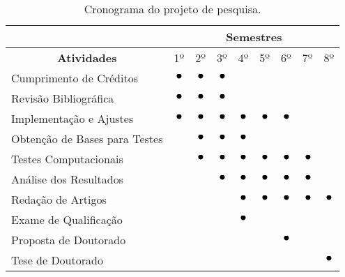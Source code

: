 \documentclass[brazil]{article}
\newcommand{\bigbullet}{\,\begin{picture}(-1,1)(-1,-2)\circle*{5}\end{picture}\ }
\begin{document}
\begin{table}[!h]
\begin{tabular}{l|c|c|c|c|c|c|c|c|}
  \cline{2-9}
  & \multicolumn{8}{|c|}{\textbf{Semestres}} \\
  \hline
  \multicolumn{1}{|c|}{\textbf{Atividades}}
    & 1º & 2º & 3º & 4º & 5º & 6º & 7º & 8º \\ \hline
  \multicolumn{1}{|l|}{Cumprimento de Créditos}
    & $\bigbullet$ & $\bigbullet$ & $\bigbullet$ & & & & & \\ \hline
  \multicolumn{1}{|l|}{Revisão Bibliográfica}
    & $\bigbullet$ & $\bigbullet$ & $\bigbullet$ & & & & & \\ \hline
  \multicolumn{1}{|l|}{Implementação e Ajustes}
    & $\bigbullet$ & $\bigbullet$ & $\bigbullet$ & $\bigbullet$ & $\bigbullet$ & $\bigbullet$ & & \\ \hline
  \multicolumn{1}{|l|}{Obtenção de Bases para Testes}
    & & $\bigbullet$ & $\bigbullet$ & $\bigbullet$ & & & & \\ \hline
  \multicolumn{1}{|l|}{Testes Computacionais}
    & & $\bigbullet$ & $\bigbullet$ & $\bigbullet$ & $\bigbullet$ & $\bigbullet$ & $\bigbullet$ & \\ \hline
  \multicolumn{1}{|l|}{Análise dos Resultados}
    & & & $\bigbullet$ & $\bigbullet$ & $\bigbullet$ & $\bigbullet$ & $\bigbullet$ & \\ \hline
  \multicolumn{1}{|l|}{Redação de Artigos}
    & & & & $\bigbullet$ & $\bigbullet$ & $\bigbullet$ & $\bigbullet$ & $\bigbullet$ \\ \hline
  \multicolumn{1}{|l|}{Exame de Qualificação}
    & & & & $\bigbullet$ & & & & \\ \hline
  \multicolumn{1}{|l|}{Proposta de Doutorado}
    & & & & & & $\bigbullet$ & & \\ \hline
  \multicolumn{1}{|l|}{Tese de Doutorado}
    & & & & & & & & $\bigbullet$ \\ \hline
\end{tabular}
\caption{Cronograma do projeto de pesquisa.}
\label{tab:cronograma}
\end{table}

\clearpage

{


}
\end{document}
